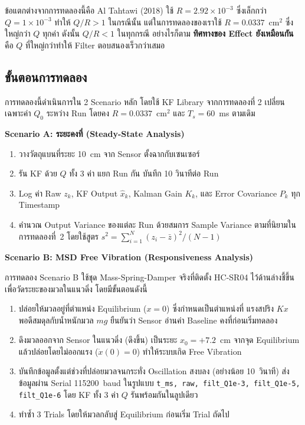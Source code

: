 ข้อแตกต่างจากการทดลองนี้คือ Al Tahtawi (2018) ใช้ $R = 2.92\times10^{-3}$
ซึ่งเล็กกว่า $Q = 1\times10^{-3}$ ทำให้ $Q/R > 1$ ในกรณีนั้น
แต่ในการทดลองของเราใช้ $R = 0.0337$~cm$^2$ ซึ่งใหญ่กว่า $Q$ ทุกค่า
ดังนั้น $Q/R < 1$ ในทุกกรณี อย่างไรก็ตาม \textbf{ทิศทางของ Effect ยังเหมือนกัน}
คือ $Q$ ที่ใหญ่กว่าทำให้ Filter ตอบสนองเร็วกว่าเสมอ

\subsection{ขั้นตอนการทดลอง}

การทดลองนี้ดำเนินการใน 2 Scenario หลัก โดยใช้ KF Library จากการทดลองที่ 2
เปลี่ยนเฉพาะค่า $Q_0$ ระหว่าง Run โดยคง $R = 0.0337$~cm$^2$ และ $T_s = 60$~ms
ตามเดิม

\textbf{Scenario A: ระยะคงที่ (Steady-State Analysis)}

\begin{enumerate}
    \item วางวัตถุแบนที่ระยะ 10~cm จาก Sensor ตั้งฉากกับเซนเซอร์
    \item รัน KF ด้วย $Q$ ทั้ง 3 ค่า แยก Run กัน บันทึก 10 วินาทีต่อ Run
    \item Log ค่า Raw $z_k$, KF Output $\hat{x}_k$, Kalman Gain $K_k$,
          และ Error Covariance $P_k$ ทุก Timestamp
    \item คำนวณ Output Variance ของแต่ละ Run ด้วยสมการ Sample Variance
          ตามที่นิยามในการทดลองที่~2 โดยใช้สูตร
          $s^2 = \sum_{i=1}^{N}(z_i - \bar{z})^2 / (N-1)$
\end{enumerate}

\textbf{Scenario B: MSD Free Vibration (Responsiveness Analysis)}
 
การทดลอง Scenario B ใช้ชุด Mass-Spring-Damper จริงที่ติดตั้ง HC-SR04
ไว้ด้านล่างชี้ขึ้นเพื่อวัดระยะของมวลในแนวดิ่ง โดยมีขั้นตอนดังนี้
 
\begin{enumerate}
    \item ปล่อยให้มวลอยู่ที่ตำแหน่ง Equilibrium ($x = 0$)
          ซึ่งกำหนดเป็นตำแหน่งที่ แรงสปริง $Kx$ พอดีสมดุลกับน้ำหนักมวล $mg$
          ยืนยันว่า Sensor อ่านค่า Baseline คงที่ก่อนเริ่มทดลอง
    \item ดึงมวลออกจาก Sensor ในแนวดิ่ง (ดึงขึ้น) เป็นระยะ
          $x_0 = +7.2$~cm จากจุด Equilibrium
          แล้วปล่อยโดยไม่ออกแรง ($\dot{x}(0) = 0$)
          ทำให้ระบบเกิด Free Vibration
    \item บันทึกข้อมูลตั้งแต่ช่วงที่ปล่อยมวลจนกระทั่ง Oscillation
          สงบลง (อย่างน้อย 10~วินาที) ส่งข้อมูลผ่าน Serial 115200~baud
          ในรูปแบบ \texttt{t\_ms, raw, filt\_Q1e-3, filt\_Q1e-5, filt\_Q1e-6}
          โดย KF ทั้ง 3 ค่า $Q$ รันพร้อมกันในลูปเดียว
    \item ทำซ้ำ 3 Trials โดยให้มวลกลับสู่ Equilibrium ก่อนเริ่ม Trial ถัดไป
\end{enumerate}
 
